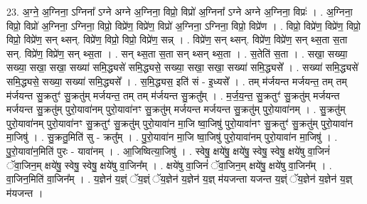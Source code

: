 \documentclass[17pt]{extarticle}
\begin{document}
23. अ॒ग्ने॒ अ॒ग्निना॒ ऽग्निना᳚ ऽग्ने अग्ने अ॒ग्निना॒ विप्रो॒ विप्रो॑ अ॒ग्निना᳚ ऽग्ने अग्ने अ॒ग्निना॒ विप्रः॑ । . अ॒ग्निना॒ विप्रो॒ विप्रो॑ अ॒ग्निना॒ ऽग्निना॒ विप्रो॒ विप्रे॑ण॒ विप्रे॑ण॒ विप्रो॑ अ॒ग्निना॒ ऽग्निना॒ विप्रो॒ विप्रे॑ण । . विप्रो॒ विप्रे॑ण॒ विप्रे॑ण॒ विप्रो॒ विप्रो॒ विप्रे॑ण॒ सन् थ्सन्. विप्रे॑ण॒ विप्रो॒ विप्रो॒ विप्रे॑ण॒ सन्न् । . विप्रे॑ण॒ सन् थ्सन्. विप्रे॑ण॒ विप्रे॑ण॒ सन् थ्स॒ता स॒ता सन्. विप्रे॑ण॒ विप्रे॑ण॒ सन् थ्स॒ता । . सन् थ्स॒ता स॒ता सन् थ्सन् थ्स॒ता । . स॒तेति॑ स॒ता । . सखा॒ सख्या॒ सख्या॒ सखा॒ सखा॒ सख्या॑ समि॒द्ध्यसे॑ समि॒द्ध्यसे॒ सख्या॒ सखा॒ सखा॒ सख्या॑ समि॒द्ध्यसे᳚ । . सख्या॑ समि॒द्ध्यसे॑ समि॒द्ध्यसे॒ सख्या॒ सख्या॑ समि॒द्ध्यसे᳚ । . स॒मि॒द्ध्यस॒ इति॑ सं - इ॒ध्यसे᳚ । . तम् म॑र्जयन्त मर्जयन्त॒ तम् तम् म॑र्जयन्त सु॒क्रतुꣳ॑ सु॒क्रतु॑म् मर्जयन्त॒ तम् तम् म॑र्जयन्त सु॒क्रतु᳚म् । . म॒र्ज॒य॒न्त॒ सु॒क्रतुꣳ॑ सु॒क्रतु॑म् मर्जयन्त मर्जयन्त सु॒क्रतु॑म् पुरो॒यावा॑नम् पुरो॒यावा॑नꣳ सु॒क्रतु॑म् मर्जयन्त मर्जयन्त सु॒क्रतु॑म् पुरो॒यावा॑नम् । . सु॒क्रतु॑म् पुरो॒यावा॑नम् पुरो॒यावा॑नꣳ सु॒क्रतुꣳ॑ सु॒क्रतु॑म् पुरो॒यावा॑न मा॒जि ष्वा॒जिषु॑ पुरो॒यावा॑नꣳ सु॒क्रतुꣳ॑ सु॒क्रतु॑म् पुरो॒यावा॑न मा॒जिषु॑ । . सु॒क्रतु॒मिति॑ सु - क्रतु᳚म् । . पु॒रो॒यावा॑न मा॒जि ष्वा॒जिषु॑ पुरो॒यावा॑नम् पुरो॒यावा॑न मा॒जिषु॑ । . पु॒रो॒यावा॑न॒मिति॑ पुरः - यावा॑नम् । . आ॒जिष्वित्या॒जिषु॑ । . स्वेषु॒ क्षये॑षु॒ क्षये॑षु॒ स्वेषु॒ स्वेषु॒ क्षये॑षु वा॒जिनं॑ ॅवा॒जिन॒म् क्षये॑षु॒ स्वेषु॒ स्वेषु॒ क्षये॑षु वा॒जिन᳚म् । . क्षये॑षु वा॒जिनं॑ ॅवा॒जिन॒म् क्षये॑षु॒ क्षये॑षु वा॒जिन᳚म् । . वा॒जिन॒मिति॑ वा॒जिन᳚म् । . य॒ज्ञेन॑ य॒ज्ञ्ं ॅय॒ज्ञ्ं ॅय॒ज्ञेन॑ य॒ज्ञेन॑ य॒ज्ञ् म॑यजन्ता यजन्त य॒ज्ञ्ं ॅय॒ज्ञेन॑ य॒ज्ञेन॑ य॒ज्ञ् म॑यजन्त । \newline
\end{document}
